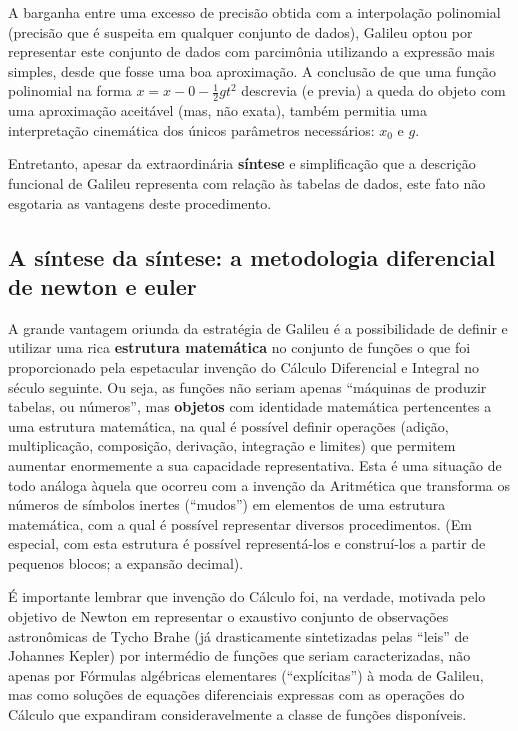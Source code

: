     A barganha entre uma excesso de precisão obtida com a interpolação polinomial (precisão que é suspeita em qualquer conjunto de dados), Galileu optou por representar este conjunto de dados com parcimônia utilizando a expressão mais simples, desde que fosse uma boa aproximação. A conclusão de que uma função polinomial na forma \(x = x-0 - \frac{1}{2} gt^2\) descrevia (e previa) a queda do objeto com uma aproximação aceitável (mas, não exata), também permitia uma interpretação cinemática dos únicos parâmetros necessários: \(x_0\) e \(g\).

    Entretanto, apesar da extraordinária \textbf{síntese} e simplificação que a descrição funcional de Galileu representa com relação às tabelas de dados, este fato não esgotaria as vantagens deste procedimento.

\subsection{A síntese da síntese: a metodologia diferencial de newton e euler}

    A grande vantagem oriunda da estratégia de Galileu é a possibilidade de definir e utilizar uma rica \textbf{estrutura matemática} no conjunto de funções o que foi proporcionado pela espetacular invenção do Cálculo Diferencial e Integral no século seguinte. Ou seja, as funções não seriam apenas ``máquinas de produzir tabelas, ou números'', mas \textbf{objetos} com identidade matemática pertencentes a uma estrutura matemática, na qual é possível definir operações (adição, multiplicação, composição, derivação, integração e limites) que permitem aumentar enormemente a sua capacidade representativa. Esta é uma situação de todo análoga àquela que ocorreu com a invenção da Aritmética que transforma os números de símbolos inertes (``mudos'') em elementos de uma estrutura matemática, com a qual é possível representar diversos procedimentos. (Em especial, com esta estrutura é possível representá-los e construí-los a partir de pequenos blocos; a expansão decimal).

    É importante lembrar que invenção do Cálculo foi, na verdade, motivada pelo objetivo de Newton em representar o exaustivo conjunto de observações astronômicas de Tycho Brahe (já drasticamente sintetizadas pelas ``leis'' de Johannes Kepler) por intermédio de funções que seriam caracterizadas, não apenas por Fórmulas algébricas elementares (``explícitas'') à moda de Galileu, mas como soluções de equações diferenciais expressas com as operações do Cálculo que expandiram consideravelmente a classe de funções disponíveis.

